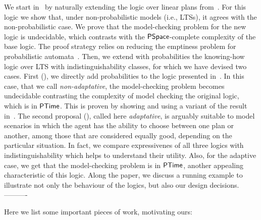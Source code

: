 We start in~ by naturally extending the logic over linear plans from~\cite{Wang15lori,Wang16,Wang2016}.  For this logic we show that, under non-probabilistic models (i.e., LTSs), it agrees with the non-probabilistic case. We prove that the model-checking problem for the new logic is undecidable,  which contrasts  with the ${\rm\textsf{PSpace}}$-complete complexity of the base logic. The proof strategy relies on reducing the emptiness problem for probabilistic automata~\cite{MadaniHC99}. Then, we extend with probabilities the knowing-how logic over LTS with indistinguishability classes, for which we have devised two cases.  First (), we directly add probabilities to the logic presented in~\cite{AFSVQ21}.  In this case,  that we call \emph{non-adaptative}, the model-checking problem becomes undecidable  contrasting the complexity of model checking the original logic, which is in  ${\rm\textsf{PTime}}$. This is proven by showing and using a variant of the result in~\cite{MadaniHC99}. The second proposal (), called here \emph{adaptative}, is arguably suitable to model scenarios in which the agent has the ability to choose between one plan or another, among those that are considered equally good, depending on the particular situation. In fact, we compare expressivenes of all three logics with indistinguishability which helps to understand their utility. Also, for the adaptive case, 
we get that the model-checking problem is in ${\rm\textsf{PTime}}$, another appealing characteristic of this logic. Along the paper, we discuss a running example to illustrate not only the behaviour of the logics, but also our design decisions.  
\iffalse
---------- 

Here we list some important pieces of work, motivating ours:

